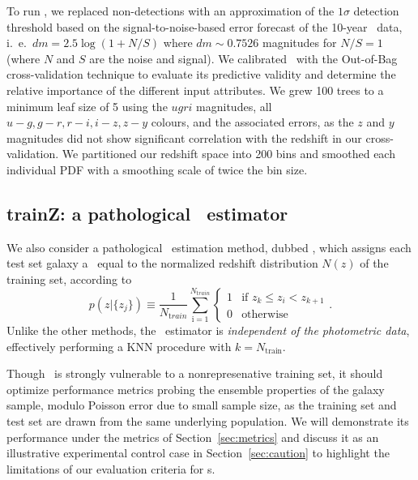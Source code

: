 To run \tpz, we replaced non-detections with an approximation of the $1\sigma$ detection threshold based on the signal-to-noise-based error forecast of the 10-year \lsst\ data, i.~e.~$dm = 2.5 \log (1 + N/S)$ where $dm \sim 0.7526$ magnitudes for $N/S = 1$ (where $N$ and $S$ are the noise and signal).
We calibrated \tpz\ with the Out-of-Bag cross-validation technique \citep{Breiman:84,Carrasco_Kind:13} to evaluate its predictive validity and determine the relative importance of the different input attributes.
We grew 100 trees to a minimum leaf size of 5 using the $ugri$ magnitudes, all $u-g, g-r, r-i, i-z, z-y$ colours, and the associated errors, as the $z$ and $y$ magnitudes did not show significant correlation with the redshift in our cross-validation.
We partitioned our redshift space into 200 bins and smoothed each individual PDF with a smoothing scale of twice the bin size.

\subsection{trainZ: a pathological \pzpdf\ estimator}
\label{sec:trainz}

We also consider a pathological \pzpdf\ estimation method, dubbed \trainz, which assigns each test set galaxy a \pzpdf\ equal to the normalized redshift distribution $N(z)$ of the training set, according to
\begin{equation}
	p(z \vert \{z_{j}\}) \equiv \frac{1}{N_{ \mathrm train}}\sum_{\mathrm i=1}^{N_{\mathrm train}} \begin{cases} 1 & \text{if\ } z_{k}\leq z_{i} < z_{k+1}\\ 0 & \text{otherwise} \end{cases}.
\end{equation}
Unlike the other methods, the \trainz\ estimator is \textit{independent of the photometric data}, effectively performing a KNN procedure with $k=N_{\mathrm{train}}$.

Though \trainz\ is strongly vulnerable to a nonrepresenative training set, it should optimize performance metrics probing the ensemble properties of the galaxy sample, modulo Poisson error due to small sample size, as the training set and test set are drawn from the same underlying population.
We will demonstrate its performance under the metrics of Section~\ref{sec:metrics} and discuss it as an illustrative experimental control case in Section~\ref{sec:caution} to highlight the limitations of our evaluation criteria for \pzpdf s.
